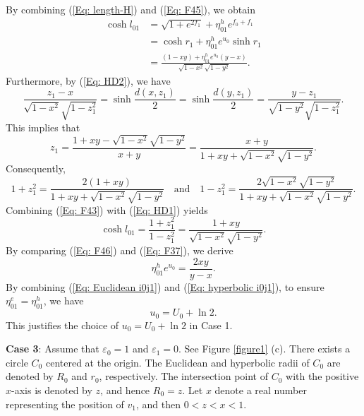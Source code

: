\documentclass[12pt]{amsart}
\theoremstyle{definition}
\begin{document}
By combining (\ref{Eq: length-H}) and (\ref{Eq: F45}), we obtain
\begin{equation}\label{Eq: F46}
\begin{aligned}
\cosh l_{01}
&=\sqrt{1+e^{2f_1}}
+\eta_{01}^he^{f_0+f_1}\\
&=\cosh r_1+\eta_{01}^he^{u_0}\sinh r_1\\
&=\frac{(1-xy)+\eta_{01}^he^{u_0}(y-x)}{\sqrt{1-x^2}\sqrt{1-y^2}}.
\end{aligned}
\end{equation}
Furthermore, by (\ref{Eq: HD2}), we have
\begin{equation*}
\frac{z_1-x}{\sqrt{1-x^2}\sqrt{1-z_1^2}}
=\sinh\frac{d(x,z_1)}{2}
=\sinh\frac{d(y,z_1)}{2}
=\frac{y-z_1}{\sqrt{1-y^2}\sqrt{1-z_1^2}}.
\end{equation*}
This implies that
\begin{equation}\label{Eq: F42}
z_1
=\frac{1+xy-\sqrt{1-x^2}\sqrt{1-y^2}}{x+y}
=\frac{x+y}{1+xy+\sqrt{1-x^2}\sqrt{1-y^2}}.
\end{equation}
Consequently,
\begin{equation}\label{Eq: F43}
1+z^2_1=\frac{2(1+xy)}{1+xy+\sqrt{1-x^2}\sqrt{1-y^2}}
\quad \text{and} \quad
1-z^2_1=\frac{2\sqrt{1-x^2}\sqrt{1-y^2}}{1+xy+\sqrt{1-x^2}\sqrt{1-y^2}}.
\end{equation}
Combining (\ref{Eq: F43}) with (\ref{Eq: HD1}) yields
\begin{equation}\label{Eq: F37}
\cosh l_{01}=\frac{1+z_1^2}{1-z_1^2}
=\frac{1+xy}{\sqrt{1-x^2}\sqrt{1-y^2}}.
\end{equation}
By comparing (\ref{Eq: F46}) and (\ref{Eq: F37}), we derive
\begin{equation}\label{Eq: hyperbolic i0j1}
\eta_{01}^he^{u_0}=\frac{2xy}{y-x}.
\end{equation}
By combining (\ref{Eq: Euclidean i0j1}) and (\ref{Eq: hyperbolic i0j1}),
to ensure $\eta_{01}^e=\eta_{01}^h$, we have
\begin{equation*}
u_0=U_0+\ln 2.
\end{equation*}
This justifies the choice of $u_0=U_0+\ln 2$ in Case 1.

\textbf{Case 3}:
Assume that $\varepsilon_0=1$ and $\varepsilon_1=0$.
See Figure \ref{figure1} (c).
There exists a circle $C_0$ centered at the origin.
The Euclidean and hyperbolic radii of $C_0$ are denoted by $R_0$ and $r_0$, respectively.
The intersection point of $C_0$ with the positive $x$-axis is denoted by $z$, and hence $R_0=z$.
Let $x$ denote a real number representing the position of $v_1$, and then $0<z<x<1$.
\end{document}
